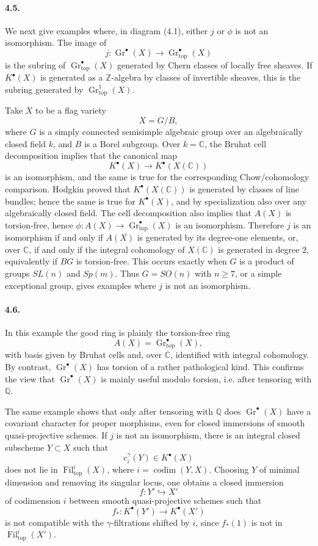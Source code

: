 \documentclass[11pt]{article}
\theoremstyle{plain}
\theoremstyle{definition}
\theoremstyle{remark}
\newcommand{\CC}{\mathbb C}
\newcommand{\QQ}{\mathbb Q}
\newcommand{\ZZ}{\mathbb Z}
\DeclareMathOperator{\Gr}{Gr}
\DeclareMathOperator{\codim}{codim}
\newcommand{\longto}{\longrightarrow}
\providecommand{\codim}{\operatorname{codim}}
\providecommand{\Fil}{\operatorname{Fil}}
\providecommand{\topf}{\mathrm{top}}
\begin{document}
\paragraph{4.5.}
We next give examples where, in diagram (4.1), either $j$ or $\phi$ is not an isomorphism. The image of
\[
j:\Gr^\bullet(X)\to\Gr^\bullet_{\topf}(X)
\]
is the subring of $\Gr^\bullet_{\topf}(X)$ generated by Chern classes of locally free sheaves. If $K^\bullet(X)$ is generated as a $\ZZ$-algebra by classes of invertible sheaves, this is the subring generated by $\Gr^1_{\topf}(X)$.

Take $X$ to be a flag variety
\[
X=G/B,
\]
where $G$ is a simply connected semisimple algebraic group over an algebraically closed field $k$, and $B$ is a Borel subgroup. Over $k=\CC$, the Bruhat cell decomposition implies that the canonical map
\[
K^\bullet(X)\longto K^\bullet(X(\CC))
\]
is an isomorphism, and the same is true for the corresponding Chow/cohomology comparison. Hodgkin proved that $K^\bullet(X(\CC))$ is generated by classes of line bundles; hence the same is true for $K^\bullet(X)$, and by specialization also over any algebraically closed field. The cell decomposition also implies that $A(X)$ is torsion-free, hence $\phi:A(X)\to\Gr^\bullet_{\topf}(X)$ is an isomorphism. Therefore $j$ is an isomorphism if and only if $A(X)$ is generated by its degree-one elements, or, over $\CC$, if and only if the integral cohomology of $X(\CC)$ is generated in degree $2$, equivalently if $BG$ is torsion-free. This occurs exactly when $G$ is a product of groups $SL(n)$ and $Sp(m)$. Thus $G=SO(n)$ with $n\geq7$, or a simple exceptional group, gives examples where $j$ is not an isomorphism.

\paragraph{4.6.}
In this example the good ring is plainly the torsion-free ring
\[
A(X)=\Gr^\bullet_{\topf}(X),
\]
with basis given by Bruhat cells and, over $\CC$, identified with integral cohomology. By contrast, $\Gr^\bullet(X)$ has torsion of a rather pathological kind. This confirms the view that $\Gr^\bullet(X)$ is mainly useful modulo torsion, i.e. after tensoring with $\QQ$.

The same example shows that only after tensoring with $\QQ$ does $\Gr^\bullet(X)$ have a covariant character for proper morphisms, even for closed immersions of smooth quasi-projective schemes. If $j$ is not an isomorphism, there is an integral closed subscheme $Y\subset X$ such that
\[
c_i^\gamma(Y)\in K^\bullet(X)
\]
does not lie in $\Fil^i_{\topf}(X)$, where $i=\codim(Y,X)$. Choosing $Y$ of minimal dimension and removing its singular locus, one obtains a closed immersion
\[
f:Y'\hookrightarrow X'
\]
of codimension $i$ between smooth quasi-projective schemes such that
\[
f_*:K^\bullet(Y')\to K^\bullet(X')
\]
is not compatible with the $\gamma$-filtrations shifted by $i$, since $f_*(1)$ is not in $\Fil^i_{\topf}(X')$.
\end{document}
